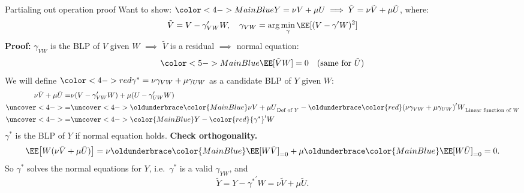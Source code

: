 \documentclass[compress, 8pt]{beamer}
\begin{document}
\begin{frame}{Partialing out operation proof}
    Want to show: ${\color<4->{MainBlue}Y = \nu V + \mu U} \implies \tilde{Y} = \nu \tilde{V} + \mu \tilde{U}$, where:
    \begin{equation*}
        \tilde{V} = V - \gamma_{VW}^\prime W, \quad \gamma_{VW} = \arg \min_{\gamma} \EE [(V - \gamma^\prime W)^2]
    \end{equation*}
        \textbf{Proof:} $\gamma_{VW}$ is the BLP of $V$ given $W$ $\implies$ $\tilde{V}$ is a residual $\implies$ normal equation:
    \begin{align*}
        {\color<5->{MainBlue}\EE [\tilde{V} W]} = 0 \quad (\text{same for } \tilde{U})
    \end{align*}
    We will define ${\color<4->{red}\gamma^* = \nu \gamma_{VW} + \mu \gamma_{UW}}$ as a candidate BLP of $Y$ given $W$:
    \begin{align*}
        \nu \tilde{V} + \mu \tilde{U} =& \nu( V - \gamma_{VW}^\prime W) + \mu ( U - \gamma_{UW}^\prime W) \\
        \uncover<4->{=}& \uncover<4->{\underbrace{\color{MainBlue}\nu V + \mu U}_{\text{Def of $Y$}} - \underbrace{{\color{red}(\nu \gamma_{VW} + \mu \gamma_{UW})}^\prime W}_{\text{Linear function of $W$}}} \\
        \uncover<4->{=}& \uncover<4->{{\color{MainBlue}Y} - {\color{red}{\gamma^*}}^\prime W}
    \end{align*}
    $\gamma^*$ is the BLP of $Y$ if normal equation holds. \textbf{Check orthogonality.}
    \begin{equation*}
        \EE\big[W(\nu \tilde{V} + \mu \tilde{U})\big]
        = \nu \underbrace{\color{MainBlue}\EE[W \tilde{V}]}_{=0} + \mu \underbrace{\color{MainBlue}\EE[W \tilde{U}]}_{=0} = 0 .
    \end{equation*}
    So $\gamma^*$ solves the normal equations for $Y$, i.e.\ $\gamma^*$ is a valid $\gamma_{YW}$, and
    \begin{equation*}
        \tilde{Y} = Y - {\gamma^*}^\prime W = \nu \tilde{V} + \mu \tilde{U}.
    \end{equation*}

\end{frame}
\end{document}
